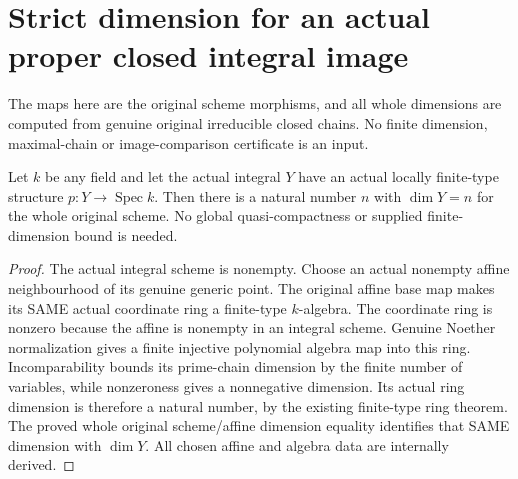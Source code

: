 \section{Strict dimension for an actual proper closed integral image}
The maps here are the original scheme morphisms, and all whole dimensions
are computed from genuine original irreducible closed chains. No finite
dimension, maximal-chain or image-comparison certificate is an input.

\begin{lemma}
\label{lem:pl-gauss-original-whole-dimension-natural}
\leanok
Let $k$ be any field and let the actual integral $Y$ have an actual
locally finite-type structure $p:Y\to\operatorname{Spec}k$. Then there
is a natural number $n$ with $\dim Y=n$ for the whole original scheme.
No global quasi-compactness or supplied finite-dimension bound is needed.
\end{lemma}
\begin{proof}
The actual integral scheme is nonempty. Choose an actual nonempty affine
neighbourhood of its genuine generic point. The original affine base map
makes its SAME actual coordinate ring a finite-type $k$-algebra. The
coordinate ring is nonzero because the affine is nonempty in an integral
scheme. Genuine Noether normalization gives a finite injective polynomial
algebra map into this ring. Incomparability bounds its prime-chain
dimension by the finite number of variables, while nonzeroness gives a
nonnegative dimension. Its actual ring dimension is therefore a natural
number, by the existing finite-type ring theorem. The proved whole
original scheme/affine dimension equality identifies that SAME dimension
with $\dim Y$. All chosen affine and algebra data are internally derived.
\end{proof}

